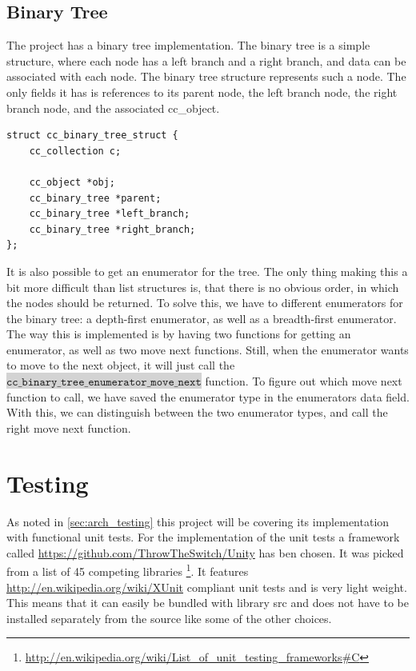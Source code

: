\documentclass[table]{ituthesis}
\newcommand{\highlight}[1]{\colorbox{lightGray}{$\displaystyle \texttt{#1}$}}
\begin{document}
	\subsection{Binary Tree}
	
	The project has a binary tree implementation. The binary tree is a simple structure, where each node has a left branch and a right branch, and data can be associated with each node. The binary tree structure represents such a node. The only fields it has is references to its parent node, the left branch node, the right branch node, and the associated cc\_object.

\begin{lstlisting}[label=cc_binary_tree-struct,caption=Internal representation of Binary Tree]
struct cc_binary_tree_struct {
	cc_collection c;
	
	cc_object *obj;
	cc_binary_tree *parent;
	cc_binary_tree *left_branch;
	cc_binary_tree *right_branch;
};
\end{lstlisting}

It is also possible to get an enumerator for the tree. The only thing making this a bit more difficult than list structures is, that there is no obvious order, in which the nodes should be returned. To solve this, we have to different enumerators for the binary tree: a depth-first enumerator, as well as a breadth-first enumerator. The way this is implemented is by having two functions for getting an enumerator, as well as two move next functions. Still, when the enumerator wants to move to the next object, it will just call the \highlight{cc\_binary\_tree\_enumerator\_move\_next} function. To figure out which move next function to call, we have saved the enumerator type in the enumerators data field. With this, we can distinguish between the two enumerator types, and call the right move next function.
	

\section{Testing}

	As noted in \autoref{sec:arch_testing} this project will be covering its implementation with functional unit tests. For the implementation of the unit tests a framework called \href{Unity}{https://github.com/ThrowTheSwitch/Unity} has ben chosen. It was picked from a list of 45 competing libraries \footnote{\href{http://en.wikipedia.org/wiki/List\_of\_unit\_testing\_frameworks\#C}{http://en.wikipedia.org/wiki/List\_of\_unit\_testing\_frameworks\#C}}. It features \href{xUnit}{http://en.wikipedia.org/wiki/XUnit} compliant unit tests and is very light weight. This means that it can easily be bundled with library src and does not have to be installed separately from the source like some of the other choices.
\end{document}
